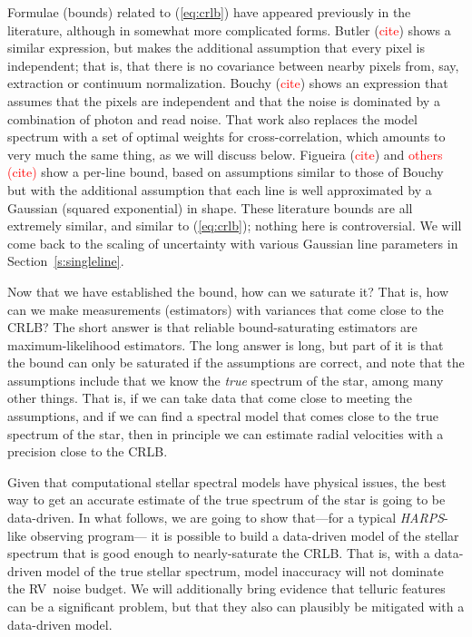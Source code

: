 \documentclass[modern]{aastex62}
\newcommand{\sectionname}{Section}
\newcommand{\todo}[1]{\textcolor{red}{#1}}  %
\newcommand{\acronym}[1]{{\small{#1}}}
\newcommand{\project}[1]{\textsl{#1}}
\newcommand{\HARPS}{\project{\acronym{HARPS}}}
\newcommand{\RV}{\acronym{RV}}
\newcommand{\CRLB}{\acronym{CRLB}}
\begin{document}
Formulae (bounds) related to (\ref{eq:crlb}) have appeared previously
in the literature, although in somewhat more complicated forms.
Butler (\todo{cite}) shows a similar expression, but makes the additional
assumption that every pixel is independent; that is, that there is no
covariance between nearby pixels from, say, extraction or continuum normalization.
Bouchy (\todo{cite}) shows an expression that assumes that the pixels
are independent and that the noise is dominated by a combination of photon
and read noise. 
That work also replaces the model spectrum with a set of optimal
weights for cross-correlation, which amounts to very much the same thing,
as we will discuss below.
Figueira (\todo{cite}) and \todo{others (cite)} show a per-line
bound, based on assumptions similar to those of Bouchy but with the additional assumption that
each line is well approximated by a Gaussian (squared exponential) in shape.
These literature bounds are all extremely similar, and similar to (\ref{eq:crlb});
nothing here is controversial.
We will come back to the scaling of uncertainty with various
Gaussian line parameters in \sectionname~\ref{s:singleline}.

Now that we have established the bound, how can we saturate it? That is,
how can we make measurements (estimators) with variances that come close to the \CRLB?
The short answer is that reliable bound-saturating estimators are maximum-likelihood estimators.
The long answer is long, but part of it is that the bound can only be saturated if the
assumptions are correct, and note that the assumptions include that we know the
\emph{true} spectrum of the star, among many other things.
That is, if we can take data that come close to meeting the assumptions, and
if we can find a spectral model that comes close to the true spectrum of the star,
then in principle we can estimate radial velocities with a precision close to the \CRLB.

Given that computational stellar spectral models have physical issues, the best way
to get an accurate estimate of the true spectrum of the star is going to be data-driven.
In what follows, we are going to show that---for a typical \HARPS-like observing program---%
it is possible to build a data-driven model of the stellar spectrum that is good enough
to nearly-saturate the \CRLB.
That is, with a data-driven model of the true stellar spectrum, model inaccuracy will
not dominate the \RV\ noise budget.
We will additionally bring evidence that telluric features can be a significant problem,
but that they also can plausibly be mitigated with a data-driven model.
\end{document}
